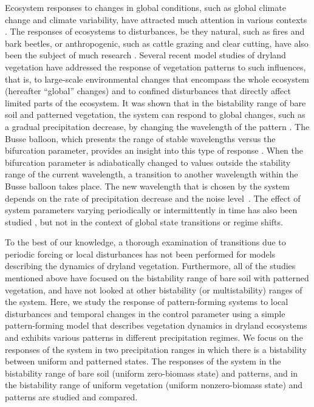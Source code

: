 \documentclass[aps,prl,preprint,superscriptaddress,floatfix]{revtex4-1}
\begin{document}
 Ecosystem responses to changes in global conditions, such as global climate change and climate variability, have attracted much attention in various contexts
\cite{walther2002,marshall2008,parmesan2006,walther2010,Anderson2012,Maclean2011,cramer2001,brown1997,melillo1993,swetnam2010,porporato2004,pounds1999,mcgowan1998climate,yizhaqwrr2014}. 
The responses of ecosystems to disturbances, be they natural, such as fires and bark beetles, or anthropogenic, 
such as cattle grazing and clear cutting, have also been the subject of much research \cite{Turner2003,Goetz2007,abdelnour2011,white2001search,mcmillan2011}. 
Several recent model studies of dryland vegetation have addressed the response of vegetation patterns to such influences, 
that is, to large-scale environmental changes that encompass the whole ecosystem (hereafter ``global'' changes) and to confined disturbances that directly affect limited parts of the ecosystem.
It was shown that in the bistability range of bare soil and patterned vegetation, the system can respond to global changes, such as a gradual precipitation decrease, 
by changing the wavelength of the pattern \cite{zelnik2013regime,vanderStelt2013nonl_sci,Sherratt20138,Sherratt2014,Siteur201481}. 
The Busse balloon, which presents the range of stable wavelengths versus the bifurcation parameter, provides an insight into this type of response \cite{vanderStelt2013nonl_sci}. 
When the bifurcation parameter is adiabatically changed to values outside the stability range of the current wavelength, a transition to another wavelength within the Busse balloon takes place. 
The new wavelength that is chosen by the system depends on the rate of precipitation decrease and the noise level~\cite{Siteur201481}.
The effect of system parameters varying periodically or intermittently in time has also been studied \cite{guttal2007self,Kletter2009jtb,Sheffer2011jtb,zhao2014rich,Gandhi2015prl}, 
but not in the context of global state transitions or regime shifts.

To the best of our knowledge, a thorough examination of transitions due to periodic forcing or local disturbances has not been performed for models describing the dynamics of dryland vegetation.
Furthermore, all of the studies mentioned above have focused on the bistability range of bare soil with patterned vegetation, and have not looked at other bistability (or multistability) ranges of the system.
Here, we study the response of pattern-forming systems to local disturbances and temporal changes in the control parameter 
using a simple pattern-forming model that describes vegetation dynamics in dryland ecosystems and exhibits various patterns in different precipitation regimes.
We focus on the responses of the system in two precipitation ranges in which there is a bistability between uniform and patterned states.
The responses of the system in the bistability range of bare soil (uniform zero-biomass state) and patterns, and in the bistability range of uniform vegetation (uniform nonzero-biomass state) and patterns are studied and compared.
\end{document}
